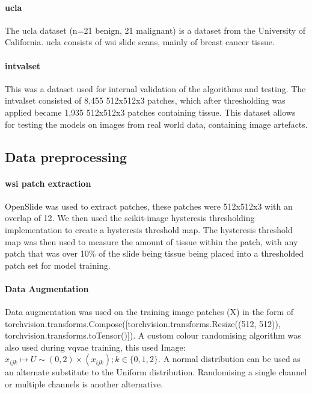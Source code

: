 \documentclass[review]{elsarticle}
\begin{document}
\paragraph{\gls{ucla}} The \gls{ucla} dataset (n=21 benign, 21 malignant) is a dataset from the University of California. \gls{ucla} consists of \gls{wsi} slide scans, mainly of breast cancer tissue.

\paragraph{\gls{intvalset}} This was a dataset used for internal validation of the algorithms and testing. The \gls{intvalset} consisted of 8,455 512x512x3 patches, which after thresholding was applied became 1,935 512x512x3 patches containing tissue. This dataset allows for testing the models on images from real world data, containing image artefacts.

\subsection{Data preprocessing}
\paragraph{\gls{wsi} patch extraction} OpenSlide was used to extract patches, these patches were 512x512x3 with an overlap of 12. We then used the scikit-image hysteresis thresholding implementation to create a hysteresis threshold map. The hysteresis threshold map was then used to measure the amount of tissue within the patch, with any patch that was over 10\% of the slide being tissue being placed into a thresholded patch set for model training.

\paragraph{Data Augmentation} Data augmentation was used on the training image patches (X) in the form of torchvision.transforms.Compose([torchvision.transforms.Resize((512, 512)), torchvision.transforms.toTensor()]). A custom colour randomising algorithm was also used during \gls{vqvae} training, this used Image:$x_{ijk}\mapsto U\sim(0,2) \times (x_{ijk}); k\in \{0,1,2\}$. A normal distribution can be used as an alternate substitute to the Uniform distribution. Randomising a single channel or multiple channels is another alternative.
\end{document}
